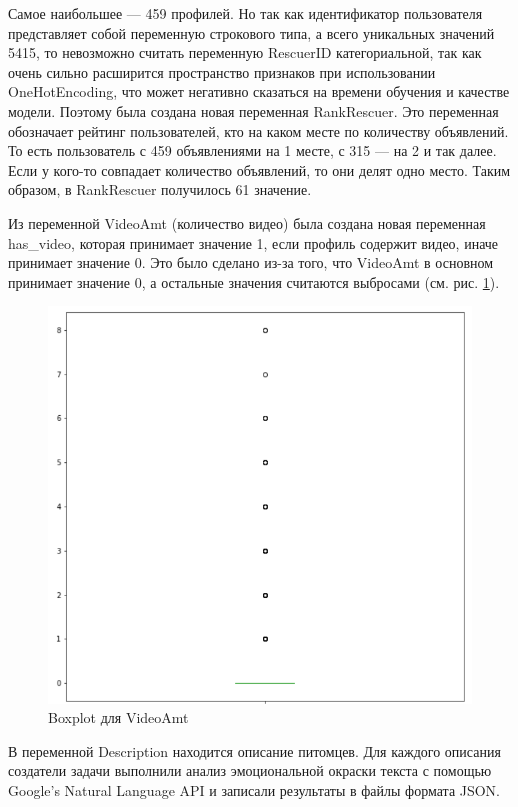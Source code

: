 \documentclass[14pt]{mmcs_article}
\begin{document}
Самое наибольшее --- 459 профилей. Но так как идентификатор пользователя представляет собой переменную строкового типа, а всего уникальных значений 5415, то невозможно считать переменную RescuerID категориальной, так как очень сильно расширится пространство признаков при использовании OneHotEncoding, что может негативно сказаться на времени обучения и качестве модели. Поэтому была создана новая переменная RankRescuer. Это переменная обозначает рейтинг пользователей, кто на каком месте по количеству объявлений. То есть пользователь с 459 объявлениями на 1 месте, с 315 --- на 2 и так далее. Если у кого-то совпадает количество объявлений, то они делят одно место. Таким образом, в RankRescuer получилось 61 значение.

Из переменной VideoAmt (количество видео) была создана новая переменная has\_video, которая принимает значение 1, если профиль содержит видео, иначе принимает значение 0. Это было сделано из-за того, что VideoAmt в основном принимает значение 0, а остальные значения считаются выбросами (см. рис. \ref{analyse:videooutlier}).

\begin{figure}[H]
	\centering
	\includegraphics[scale=0.6]{videooutlier.png}
	\caption{Boxplot для VideoAmt}\label{analyse:videooutlier}
\end{figure}

В переменной Description находится описание питомцев. Для каждого описания создатели задачи выполнили анализ эмоциональной окраски текста с помощью Google’s Natural Language API и записали результаты в файлы формата JSON. 
\end{document}

